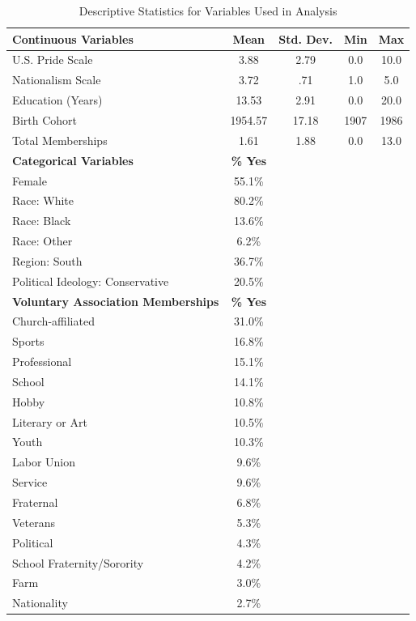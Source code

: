 \documentclass[12pt,letterpaper]{article}
\begin{document}
\begin{table}[htbp]
\centering
\caption{Descriptive Statistics for Variables Used in Analysis}
\label{tab:descriptives}
\begin{tabular}{lcccc}
\toprule
\textbf{Continuous Variables} & \textbf{Mean} & \textbf{Std. Dev.} & \textbf{Min} & \textbf{Max} \\
\midrule
U.S. Pride Scale & 3.88 & 2.79 & 0.0 & 10.0 \\
Nationalism Scale & 3.72 & .71 & 1.0 & 5.0 \\
Education (Years) & 13.53 & 2.91 & 0.0 & 20.0 \\
Birth Cohort & 1954.57 & 17.18 & 1907 & 1986 \\
Total Memberships & 1.61 & 1.88 & 0.0 & 13.0 \\
\midrule
\textbf{Categorical Variables} & \textbf{\% Yes} & & & \\
\midrule
Female & 55.1\% & & & \\
Race: White & 80.2\% & & & \\
Race: Black & 13.6\% & & & \\
Race: Other & 6.2\% & & & \\
Region: South & 36.7\% & & & \\
Political Ideology: Conservative & 20.5\% & & & \\
\midrule
\textbf{Voluntary Association Memberships} & \textbf{\% Yes} & & & \\
\midrule
Church-affiliated & 31.0\% & & & \\
Sports & 16.8\% & & & \\
Professional & 15.1\% & & & \\
School & 14.1\% & & & \\
Hobby & 10.8\% & & & \\
Literary or Art & 10.5\% & & & \\
Youth & 10.3\% & & & \\
Labor Union & 9.6\% & & & \\
Service & 9.6\% & & & \\
Fraternal & 6.8\% & & & \\
Veterans & 5.3\% & & & \\
Political & 4.3\% & & & \\
School Fraternity/Sorority & 4.2\% & & & \\
Farm & 3.0\% & & & \\
Nationality & 2.7\% & & & \\
\bottomrule
\end{tabular}
\end{table}
\end{document}
